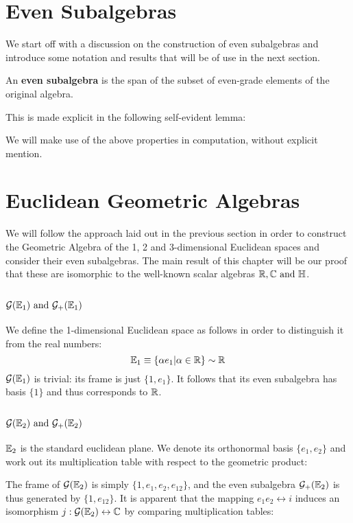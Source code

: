 \section{Even Subalgebras}
We start off with a discussion on the construction of even subalgebras and introduce some notation and results that will be of use in the next section.

\begin{definition}\label{d:even-subalgebra}
	An \textbf{even subalgebra} is the span of the subset of even-grade elements of the original algebra.
\end{definition}
This is made explicit in the following self-evident lemma:

We will make use of the above properties in computation, without explicit mention.



\section{Euclidean Geometric Algebras}
We will follow the approach laid out in the previous section in order to construct the Geometric Algebra of the 1, 2 and 3-dimensional Euclidean spaces and consider their even subalgebras.
The main result of this chapter will be our proof that these are isomorphic to the well-known scalar algebras $\R, \C \mathrm{\ and\ } \HM$.

\subsection{$\G(\E_1)\ \mathrm{and}\ \G_+(\E_1)$}

We define the 1-dimensional Euclidean space as follows in order to distinguish it from the real numbers:
\[\mathbb{E}_1 \equiv \{\alpha e_1 | \alpha \in \mathbb{R}\} \sim \mathbb{R}\]
$\mathcal{G}(\mathbb{E}_1)$  is trivial: its frame is just $\{1, e_1\}$.
It follows that its even subalgebra has basis $\{1\}$ and thus corresponds to $\mathbb{R}$.

\subsection{$\G(\E_2)\ \mathrm{and}\ \G_+(\E_2)$}

$\mathbb{E}_2$ is the standard euclidean plane. We denote its orthonormal basis $\{e_1, e_2\}$ and work out its multiplication table with respect to the geometric product:


The frame of $\mathcal{G}(\mathbb{E}_2)$ is simply $\{1, e_1, e_2, e_{12}\}$, and the even subalgebra $\mathcal{G}_+(\mathbb{E}_2)$ is thus generated by $\{1, e_{12} \}$.
It is apparent that the mapping $e_1e_2 \leftrightarrow i$ induces an isomorphism $j : \mathcal{G}(\mathbb{E}_2) \leftrightarrow \mathbb{C}$ by comparing multiplication tables:


